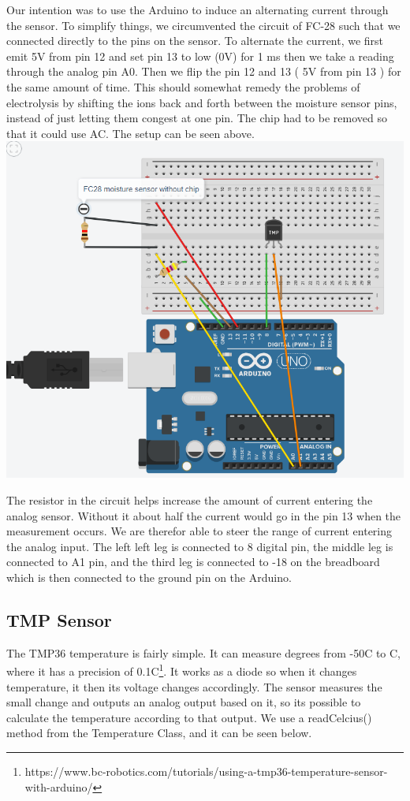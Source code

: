 \documentclass{article}
\begin{document}
Our intention was to use the Arduino to induce an alternating current through the sensor. To simplify things, we circumvented the circuit of FC-28 such that we connected directly to the pins on the sensor. To alternate the current, we first emit 5V from pin 12 and set pin 13 to low (0V) for 1 ms then we take a reading through the analog pin A0. Then we flip the pin 12 and 13 ( 5V from pin 13 ) for the same amount of time. This should somewhat remedy the problems of electrolysis by shifting the ions back and forth between the moisture sensor pins, instead of just letting them congest at one pin. The chip had to be removed so that it could use AC.
The setup can be seen above.
\includegraphics[scale = 0.50]{FC-28-Diagram.PNG}


The resistor in the circuit helps increase the amount of current entering the analog sensor. Without it about half the current would go in the pin 13 when the measurement occurs. We are therefor able to steer the range of current entering the analog input. The left left leg is connected to 8 digital pin, the middle leg is connected to A1 pin, and the third leg is connected to -18 on the breadboard which is then connected to the ground pin on the Arduino.  


\subsection{TMP Sensor}

The TMP36 temperature is fairly simple. It can measure degrees from -50\textdegree{}C to C, where it has a precision of 0.1\textdegree{}C\footnote{https://www.bc-robotics.com/tutorials/using-a-tmp36-temperature-sensor-with-arduino/}. It works as a diode so when it changes temperature, it then its voltage changes accordingly. The sensor measures the small change and outputs an analog output based on it, so its possible to calculate the temperature according to that output. We use a readCelcius() method from the Temperature Class, and it can be seen below.
\end{document}
